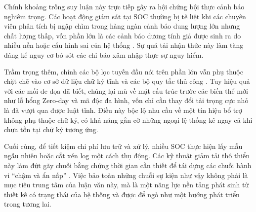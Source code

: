 Chính khoảng trống suy luận này trực tiếp gây ra hội chứng bội thực cảnh báo nghiêm trọng. Các hoạt động giám sát tại SOC thường bị tê liệt khi các chuyên viên phân tích bị ngập chìm trong hàng ngàn cảnh báo dung lượng lớn nhưng chất lượng thấp, vốn phần lớn là các cảnh báo dương tính giả được sinh ra do nhiễu nền hoặc cấu hình sai của hệ thống \cite{alertfatigue2022}. Sự quá tải nhận thức này làm tăng đáng kể nguy cơ bỏ sót các chỉ báo xâm nhập thực sự nguy hiểm.

Trầm trọng thêm, chính các bộ lọc tuyến đầu nói trên phần lớn vẫn phụ thuộc chặt chẽ vào cơ sở dữ liệu chữ ký tĩnh và các bộ quy tắc thủ công \cite{mlids2016}. Tuy hiệu quả với các mối đe dọa đã biết, chúng lại mù về mặt cấu trúc trước các biến thể mới như lỗ hổng Zero-day và mã độc đa hình, vốn chỉ cần thay đổi tải trọng cực nhỏ là đã vượt qua được luật tĩnh. Điều này bộc lộ nhu cầu về một tín hiệu bổ trợ không phụ thuộc chữ ký, có khả năng gắn cờ những ngoại lệ thống kê ngay cả khi chưa tồn tại chữ ký tương ứng.

Cuối cùng, để tiết kiệm chi phí lưu trữ và xử lý, nhiều SOC thực hiện lấy mẫu ngẫu nhiên hoặc cắt xén log một cách thụ động. Các kỹ thuật giảm tải thô thiển này làm đứt gãy chuỗi bằng chứng thời gian cần thiết để tái dựng các chuỗi hành vi ``chậm và ẩn nấp'' \cite{apt_stealth2021}. Việc bảo toàn những chuỗi sự kiện như vậy không phải là mục tiêu trung tâm của luận văn này, mà là một năng lực nền tảng phát sinh từ thiết kế có trạng thái của hệ thống và được để ngỏ như một hướng phát triển trong tương lai.

